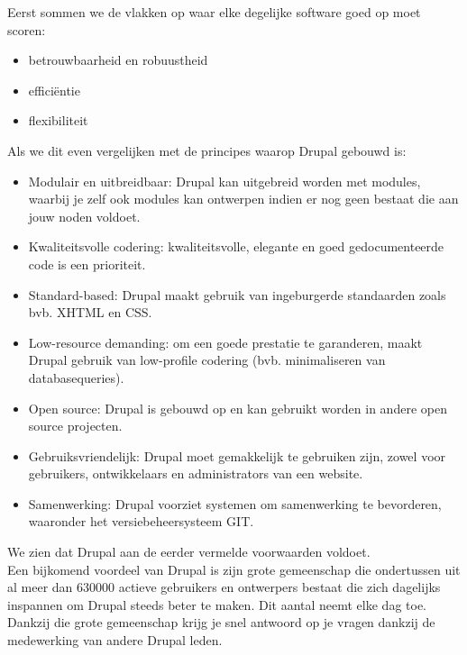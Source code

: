 Eerst sommen we de vlakken op waar elke degelijke software goed op moet scoren:
\begin{itemize}
\item betrouwbaarheid en robuustheid
\item effici\"{e}ntie
\item flexibiliteit
\end{itemize}
Als we dit even vergelijken met de principes waarop Drupal gebouwd is:
\begin{itemize}
\item Modulair en uitbreidbaar: Drupal kan uitgebreid worden met modules, waarbij je zelf ook modules kan ontwerpen indien er nog geen bestaat die aan jouw noden voldoet.
\item Kwaliteitsvolle codering: kwaliteitsvolle, elegante en goed gedocumenteerde code is een prioriteit.
\item Standard-based: Drupal maakt gebruik van ingeburgerde standaarden zoals bvb. XHTML en CSS.
\item Low-resource demanding: om een goede prestatie te garanderen, maakt Drupal gebruik van low-profile codering (bvb. minimaliseren van databasequeries).
\item Open source: Drupal is gebouwd op en kan gebruikt worden in andere open source projecten.
\item Gebruiksvriendelijk: Drupal moet gemakkelijk te gebruiken zijn, zowel voor gebruikers, ontwikkelaars en administrators van een website.
\item Samenwerking: Drupal voorziet systemen om samenwerking te bevorderen, waaronder het versiebeheersysteem GIT.
\end{itemize}
We zien dat Drupal aan de eerder vermelde voorwaarden voldoet.\\

Een bijkomend voordeel van Drupal is zijn grote gemeenschap die ondertussen uit al meer dan 630000 actieve gebruikers en ontwerpers bestaat die zich dagelijks inspannen om Drupal steeds beter te maken. Dit aantal neemt elke dag toe. Dankzij die grote gemeenschap krijg je snel antwoord op je vragen dankzij de medewerking van andere Drupal leden.\\

